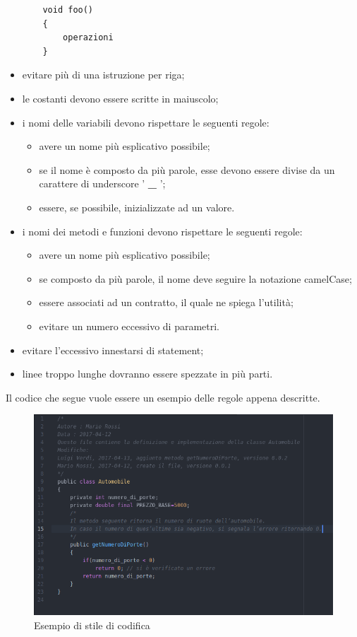 \begin{itemize}
\begin{verbatim}
 	void foo()
 	{
     	operazioni
 	}
 	\end{verbatim}
 	\item evitare più di una istruzione per riga;
 	\item le costanti devono essere scritte in maiuscolo;
 	\item i nomi delle variabili devono rispettare le seguenti regole:
 	\begin{itemize}
 		\item avere un nome più esplicativo possibile;
 		\item se il nome è composto da più parole, esse devono essere divise da un carattere di underscore ' \textbf{\_} ';
 		\item essere, se possibile, inizializzate ad un valore.
 	\end{itemize}
 	\item i nomi dei metodi e funzioni devono rispettare le seguenti regole:
 	\begin{itemize}
 		\item avere un nome più esplicativo possibile;
 		\item se composto da più parole, il nome deve seguire la notazione camelCase;
 		\item essere associati ad un contratto, il quale ne spiega l'utilità;
 		\item evitare un numero eccessivo di parametri.
 	\end{itemize}
 	\item evitare l'eccessivo innestarsi di statement;
 	\item linee troppo lunghe dovranno essere spezzate in più parti.
 \end{itemize}
 Il codice che segue vuole essere un esempio delle regole appena descritte.
\begin{figure}[h]
	\centering
	\includegraphics[scale=0.35]{img/esempioStileCodifica.png}
	\caption{Esempio di stile di codifica}
\end{figure} 
 \newpage
